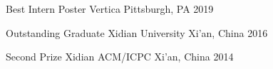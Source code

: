 
\begin{cvhonors}

  \cvhonor
    {Best Intern Poster} %
    {Vertica} %
    {Pittsburgh, PA} %
    {2019} %

  \cvhonor
    {Outstanding Graduate} %
    {Xidian University} %
    {Xi'an, China} %
    {2016} %

  \cvhonor
    {Second Prize} %
    {Xidian ACM/ICPC} %
    {Xi'an, China} %
    {2014} %

\end{cvhonors}
